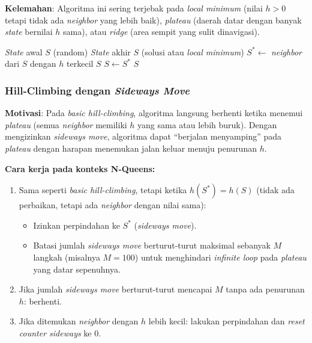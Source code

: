 \documentclass[12pt,a4paper]{article}
\begin{document}
\textbf{Kelemahan}: Algoritma ini sering terjebak pada \textit{local minimum} (nilai $h > 0$ tetapi tidak ada \textit{neighbor} yang lebih baik), \textit{plateau} (daerah datar dengan banyak \textit{state} bernilai $h$ sama), atau \textit{ridge} (area sempit yang sulit dinavigasi).

\begin{algorithm}[H]
\caption{Basic Hill-Climbing (\textit{Steepest-Ascent}) untuk N-Queens}
\label{alg:basic-hc}
\begin{algorithmic}[1]
\Require \textit{State} awal $S$ (random)
\Ensure \textit{State} akhir $S$ (solusi atau \textit{local minimum})
\Repeat
    \State $S^* \leftarrow$ \textit{neighbor} dari $S$ dengan $h$ terkecil
        \State \Return $S$ 
    \EndIf
    \State $S \leftarrow S^*$
\State \Return $S$
\end{algorithmic}
\end{algorithm}

\subsubsection{Hill-Climbing dengan \textit{Sideways Move}}
\label{subsubsec:sideways}

\textbf{Motivasi}: Pada \textit{basic hill-climbing}, algoritma langsung berhenti ketika menemui \textit{plateau} (semua \textit{neighbor} memiliki $h$ yang sama atau lebih buruk). Dengan mengizinkan \textit{sideways move}, algoritma dapat ``berjalan menyamping'' pada \textit{plateau} dengan harapan menemukan jalan keluar menuju penurunan $h$.

\textbf{Cara kerja pada konteks N-Queens:}
\begin{enumerate}[label=\arabic*.]
    \item Sama seperti \textit{basic hill-climbing}, tetapi ketika $h(S^*) = h(S)$ (tidak ada perbaikan, tetapi ada \textit{neighbor} dengan nilai sama):
    \begin{itemize}
        \item Izinkan perpindahan ke $S^*$ (\textit{sideways move}).
        \item Batasi jumlah \textit{sideways move} berturut-turut maksimal sebanyak $M$ langkah (misalnya $M = 100$) untuk menghindari \textit{infinite loop} pada \textit{plateau} yang datar sepenuhnya.
    \end{itemize}
    \item Jika jumlah \textit{sideways move} berturut-turut mencapai $M$ tanpa ada penurunan $h$: berhenti.
    \item Jika ditemukan \textit{neighbor} dengan $h$ lebih kecil: lakukan perpindahan dan \textit{reset counter sideways} ke 0.
\end{enumerate}
\end{document}
